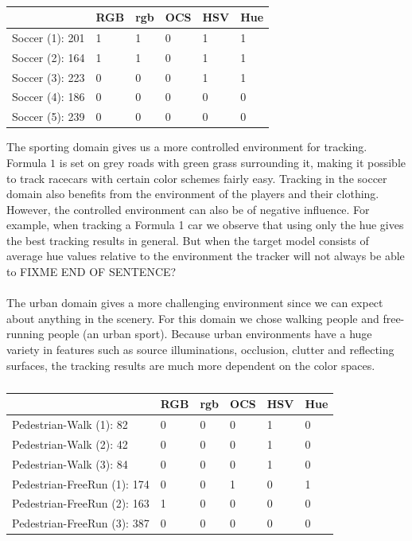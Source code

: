 \documentclass[a4paper,11pt]{article}
\begin{document}
		\begin{table}[H]
			\centering
			\begin{tabular}{ | l | l | l | l | l | l |}
			\hline
			                   & RGB & rgb & OCS & HSV & Hue \\
			\hline
			Soccer (1): 201    & 1   & 1   & 0   & 1   & 1 \\
			Soccer (2): 164    & 1   & 1   & 0   & 1   & 1 \\
			Soccer (3): 223    & 0   & 0   & 0   & 1   & 1 \\
			Soccer (4): 186    & 0   & 0   & 0   & 0   & 0 \\
			Soccer (5): 239    & 0   & 0   & 0   & 0   & 0 \\
			\hline
			\end{tabular}
			\caption{}
		\end{table}
		\noindent
		The sporting domain gives us a more controlled environment for tracking. Formula $1$ is set on
		grey roads with green grass surrounding it, making it possible to track racecars with certain
		color schemes fairly easy. Tracking in the soccer domain also benefits from the environment of
		the players and their clothing. However, the controlled environment can also be of negative
		influence. For example, when tracking a Formula 1 car we observe that using only the hue gives
		the best tracking results in general. But when the target model consists of average hue values
		relative to the environment the tracker will not always be able to FIXME END OF SENTENCE?
		\\ \\
		The urban domain gives a more challenging environment since we can expect about anything in the
		scenery. For this domain we chose walking people and free-running people (an urban sport). Because
		urban environments have a huge variety in features such as source illuminations, occlusion, clutter
		and reflecting surfaces, the tracking results are much more dependent on the color spaces.
		\begin{table}[H]
			\centering
			\begin{tabular}{ | l | l | l | l | l | l |}
			\hline
			                            & RGB & rgb & OCS & HSV & Hue \\
			\hline
			Pedestrian-Walk    (1):  82 & 0   & 0   & 0   & 1   & 0 \\
			Pedestrian-Walk    (2):  42 & 0   & 0   & 0   & 1   & 0 \\
			Pedestrian-Walk    (3):  84 & 0   & 0   & 0   & 1   & 0 \\
			Pedestrian-FreeRun (1): 174 & 0   & 0   & 1   & 0   & 1 \\
			Pedestrian-FreeRun (2): 163 & 1   & 0   & 0   & 0   & 0 \\
			Pedestrian-FreeRun (3): 387 & 0   & 0   & 0   & 0   & 0 \\
			\hline
			\end{tabular}
			\caption{}
		\end{table}
\end{document}
